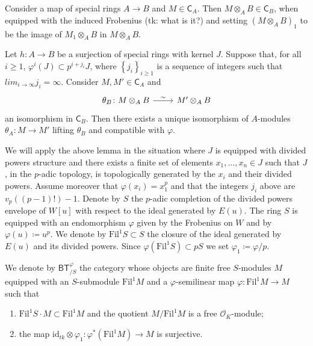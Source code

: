 \documentclass[../Main]{subfiles}
\begin{document}
\begin{defn}[]
	Consider a map of special rings $A \to B$ and $M \in \mathsf{C}_A$.
	Then $M \otimes_A B \in \mathsf{C}_B$, when equipped with
	the induced Frobenius (tk: what is it?) and setting
	$\left( M \otimes_A B \right)_1$ to be the image of
	$M_1 \otimes_A B$ in $M \otimes_A B$.
\end{defn}


\begin{lem}
	Let $h\colon A \to B$ be a surjection of special rings with kernel $J$.
	Suppose that, for all $i \geq 1$, $\varphi^i(J) \subset p^{i + j_i} J$,
	where $\left\{ j_i \right\}_{i \geq 1}$ is a sequence of integers
	such that $lim_{i \to \infty} j_i = \infty$.
	Consider $M, M' \in \mathsf{C}_A$ and
	\begin{equation*}
	\begin{tikzcd}[row sep = 0ex
		,/tikz/column 1/.append style={anchor=base east}
		,/tikz/column 2/.append style={anchor=base west}]
		\theta_B\colon M \otimes_A B 
		\arrow[r, "\sim", rightarrow] &
		M' \otimes_A B
	\end{tikzcd}
	\end{equation*} 
	an isomorphism in $\mathsf{C}_B$.
	Then there exists a unique isomorphism of $A$-modules
	$\theta_A\colon M \to M'$ lifting $\theta_B$ and compatible with $\varphi$.
\end{lem} 


\noindent
We will apply the above lemma in the situation where $J$ is equipped
with divided powers structure and there exists a finite set of elements $x_1, \ldots, x_n \in J$
such that $J$, in the $p$-adic topology, is topologically generated by 
the $x_i$ and their divided powers.
Assume moreover that $\varphi(x_i) = x_1^p$ and that the integers
$j_i$ above are $v_p \left( (p-1)! \right) - 1$.
Denote by $S$ the $p$-adic completion of the divided powers envelope
of $W[u]$ with respect to the ideal generated by $E(u)$.
The ring $S$ is equipped with an endomorphism $\varphi$ given by the Frobenius
on $W$ and by $\varphi(u) \coloneqq u^p$.
We denote by $\mathrm{Fil}^1 S \subset S$ the closure of the ideal
generated by $E(u)$ and its divided powers.
Since $\varphi( \mathrm{Fil}^1 S) \subset p S$ we set $\varphi_1 \coloneqq \varphi/p$.

\begin{defn}[]
	We denote by $\mathsf{BT}^{\varphi}_{/S}$ the category
	whose objects are finite free $S$-modules $M$
	equipped with an $S$-submodule $\mathrm{Fil}^1 M$
	and a $\varphi$-semilinear map $\varphi\colon  \mathrm{Fil}^1 M \to M$
	such that
\begin{enumerate}
	\item $\mathrm{Fil}^1 S \cdot M \subset \mathrm{Fil}^1 M$
		and the quotient $M/\mathrm{Fil}^1 M$ is a free $\mathcal{O}_{ K }$-module;
	\item the map $\mathrm{id}_{ tk } \otimes \varphi_1\colon 
		\varphi^* \left( \mathrm{Fil}^1 M \right) \to M$
		is surjective.
\end{enumerate}
\end{defn}
\end{document}
